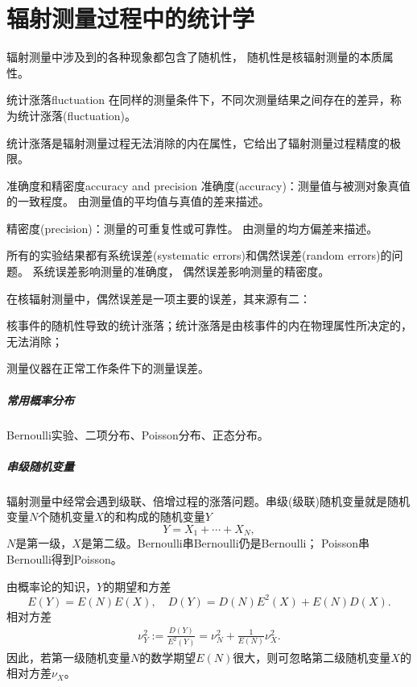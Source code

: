\chapter{辐射测量过程中的统计学}
辐射测量中涉及到的各种现象都包含了随机性，
随机性是核辐射测量的本质属性。

\begin{definition}{统计涨落}{fluctuation}
	在同样的测量条件下，不同次测量结果之间存在的差异，称为统计涨落(fluctuation)。
\end{definition}
统计涨落是辐射测量过程无法消除的内在属性，它给出了辐射测量过程精度的极限。
\begin{definition}{准确度和精密度}{accuracy and precision}
	准确度(accuracy)：测量值与被测对象真值的一致程度。
	由测量值的平均值与真值的差来描述。

	精密度(precision)：测量的可重复性或可靠性。
	由测量的均方偏差来描述。	
\end{definition}
所有的实验结果都有系统误差(systematic errors)和偶然误差(random errors)的问题。
系统误差影响测量的准确度，
偶然误差影响测量的精密度。

在核辐射测量中，偶然误差是一项主要的误差，其来源有二：
\begin{compactenum}
	\item 核事件的随机性导致的统计涨落；统计涨落是由核事件的内在物理属性所决定的，无法消除；
	\item 测量仪器在正常工作条件下的测量误差。
\end{compactenum}
\paragraph{常用概率分布}
Bernoulli实验、二项分布、Poisson分布、正态分布。
\paragraph{串级随机变量}
辐射测量中经常会遇到级联、倍增过程的涨落问题。串级(级联)随机变量就是随机变量$N$个随机变量$X$的和构成的随机变量$Y$
\[
	Y=X_1+\cdots+X_N,
\]
$N$是第一级，$X$是第二级。Bernoulli串Bernoulli仍是Bernoulli；
Poisson串Bernoulli得到Poisson。

由概率论的知识，$Y$的期望和方差
\[
	E(Y)=E(N)E(X),\quad D(Y)=D(N)E^2(X)+E(N)D(X).
\]
相对方差
\begin{align}
	\nu_Y^2:=\frac{D(Y)}{E^2(Y)}=\nu_N^2+\frac1{E(N)}\nu_X^2.
\end{align}
因此，若第一级随机变量$N$的数学期望$E(N)$很大，则可忽略第二级随机变量$X$的相对方差$\nu_X$。%

